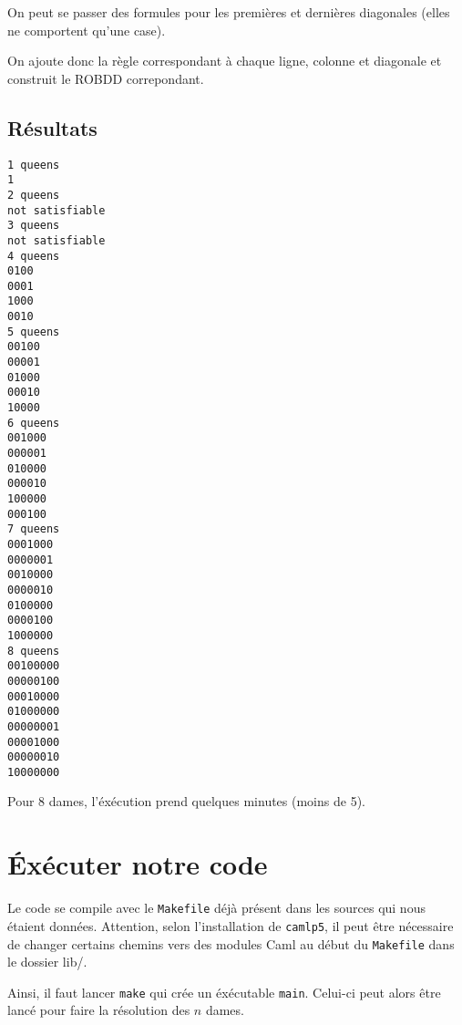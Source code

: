 \documentclass[12pt]{article}
\def\code#1{\texttt{#1}}
\begin{document}
On peut se passer des formules pour les premières et dernières diagonales (elles ne comportent qu'une case).

On ajoute donc la règle correspondant à chaque ligne, colonne et diagonale et construit le ROBDD correpondant.

\subsection*{Résultats}
\begin{lstlisting}
1 queens
1
2 queens
not satisfiable
3 queens
not satisfiable
4 queens
0100
0001
1000
0010
5 queens
00100
00001
01000
00010
10000
6 queens
001000
000001
010000
000010
100000
000100
7 queens
0001000
0000001
0010000
0000010
0100000
0000100
1000000
8 queens
00100000
00000100
00010000
01000000
00000001
00001000
00000010
10000000
\end{lstlisting}

Pour 8 dames, l'éxécution prend quelques minutes (moins de 5).

\section*{Éxécuter notre code}
Le code se compile avec le \code{Makefile} déjà présent dans les sources qui nous étaient données. Attention, selon l'installation de \code{camlp5}, il peut être nécessaire de changer certains chemins vers des modules Caml au début du \code{Makefile} dans le dossier lib/.

Ainsi, il faut lancer \code{make} qui crée un éxécutable \code{main}. Celui-ci peut alors être lancé pour faire la résolution des $n$ dames.
\end{document}
